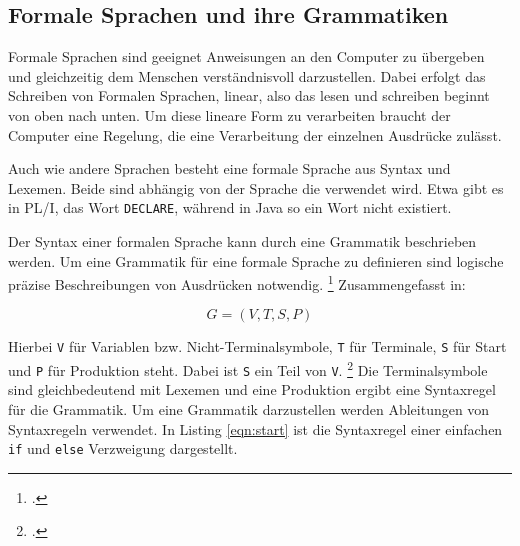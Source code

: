 \pagebreak
   
   
\subsection{Formale Sprachen und ihre Grammatiken}
Formale Sprachen sind geeignet Anweisungen an den Computer zu übergeben und gleichzeitig dem Menschen 
verständnisvoll darzustellen. Dabei erfolgt das Schreiben von Formalen Sprachen,
linear, also das lesen und schreiben beginnt von oben nach unten. 
Um diese lineare Form zu verarbeiten braucht der Computer eine Regelung, die eine Verarbeitung
der einzelnen Ausdrücke zulässt.

Auch wie andere Sprachen besteht eine formale Sprache aus Syntax und Lexemen.
Beide sind abhängig von der Sprache die verwendet wird.
Etwa gibt es in PL/I, das Wort \verb+DECLARE+, während in Java so ein Wort
nicht existiert.

Der Syntax einer formalen Sprache kann durch eine Grammatik beschrieben werden.
Um eine Grammatik für eine formale Sprache zu definieren sind logische präzise Beschreibungen von Ausdrücken notwendig. \footcite[Vgl. ][S. 149ff. ]{automata} Zusammengefasst in:

\begin{center}
	\begin{equation}\label{eqn:grammar}
		G=(V,T,S,P)
	\end{equation}
\end{center}

Hierbei \verb+V+ für Variablen bzw. Nicht-Terminalsymbole, \verb+T+ für Terminale, \verb+S+ für Start und \verb+P+ für Produktion steht. Dabei ist \verb+S+ ein Teil von \verb+V+.  \footcite[Vgl. ][S. 31ff. ]{automata}
Die Terminalsymbole sind gleichbedeutend mit Lexemen und eine Produktion ergibt eine Syntaxregel für die Grammatik.
Um eine Grammatik darzustellen werden Ableitungen von Syntaxregeln verwendet. In Listing \ref{eqn:start} ist die Syntaxregel einer einfachen \verb+if+ und \verb+else+ Verzweigung dargestellt.

